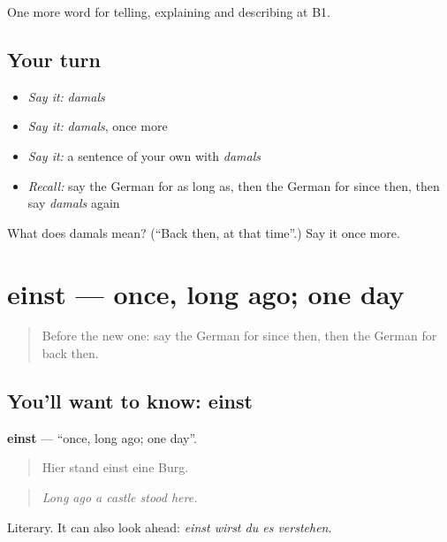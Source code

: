 \begin{grammarlens}[title={What you've built}]
One more word for telling, explaining and describing at B1.
\end{grammarlens}

\subsection*{Your turn}
\begin{itemize}
\raggedright
  \item \emph{Say it:} \emph{damals}
  \item \emph{Say it:} \emph{damals}, once more
  \item \emph{Say it:} a sentence of your own with \emph{damals}
  \item \emph{Recall:} say the German for as long as, then the German for since then, then say \emph{damals} again
\end{itemize}

\begin{tcolorbox}[breakable,colback=teal!4,colframe=teal!35!black,title={Before you move on}]
What does damals mean? (\textquotedblleft{}Back then, at that time\textquotedblright{}.) Say it once more.
\end{tcolorbox}
\section[einst]{einst — once, long ago; one day}

\label{lesson:GE-C264-einst}



\begin{quote}
Before the new one: say the German for since then, then the German for back then.
\end{quote}

\subsection*{You'll want to know: einst}
\textbf{einst} — \textquotedblleft{}once, long ago; one day\textquotedblright{}.

\begin{quote}
Hier stand einst eine Burg.
\end{quote}

\begin{quote}
\emph{Long ago a castle stood here.}
\end{quote}

Literary. It can also look ahead: \emph{einst wirst du es verstehen}.

